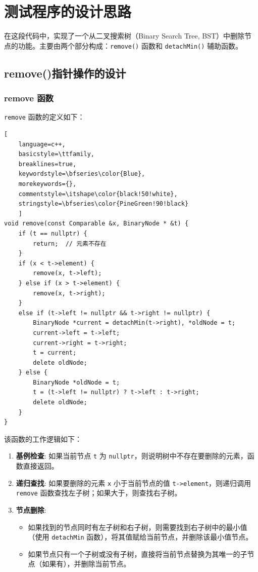 \documentclass[UTF8]{ctexart}
\begin{document}
\pagestyle{fancy}
\fancyhead{}

\section{测试程序的设计思路}
在这段代码中，实现了一个从二叉搜索树（Binary Search Tree, BST）中删除节点的功能。主要由两个部分构成：\texttt{remove()} 函数和 \texttt{detachMin()} 辅助函数。
\subsection{remove()指针操作的设计}

\subsubsection{remove 函数}
\texttt{remove} 函数的定义如下：

\begin{lstlisting}[ 
    language=c++,
    basicstyle=\ttfamily,
    breaklines=true,
    keywordstyle=\bfseries\color{Blue}, 
    morekeywords={}, 
    commentstyle=\itshape\color{black!50!white},
    stringstyle=\bfseries\color{PineGreen!90!black} 
    ]
void remove(const Comparable &x, BinaryNode * &t) {
    if (t == nullptr) {
        return;  // 元素不存在
    }
    if (x < t->element) {
        remove(x, t->left);
    } else if (x > t->element) {
        remove(x, t->right);
    } 
    else if (t->left != nullptr && t->right != nullptr) {
        BinaryNode *current = detachMin(t->right), *oldNode = t;
        current->left = t->left;
        current->right = t->right;
        t = current;
        delete oldNode;
    } else {
        BinaryNode *oldNode = t;
        t = (t->left != nullptr) ? t->left : t->right;
        delete oldNode;
    }
}
\end{lstlisting}

该函数的工作逻辑如下：

\begin{enumerate}
    \item \textbf{基例检查}: 如果当前节点 \texttt{t} 为 \texttt{nullptr}，则说明树中不存在要删除的元素，函数直接返回。
    \item \textbf{递归查找}: 如果要删除的元素 \texttt{x} 小于当前节点的值 \texttt{t->element}，则递归调用 \texttt{remove} 函数查找左子树；如果大于，则查找右子树。
    \item \textbf{节点删除}: 
    \begin{itemize}
        \item 如果找到的节点同时有左子树和右子树，则需要找到右子树中的最小值（使用 \texttt{detachMin} 函数），将其值赋给当前节点，并删除该最小值节点。
        \item 如果节点只有一个子树或没有子树，直接将当前节点替换为其唯一的子节点（如果有），并删除当前节点。
    \end{itemize}
\end{enumerate}
\end{document}
